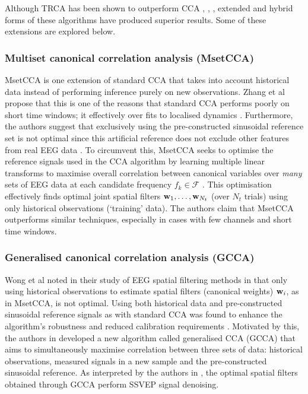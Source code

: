 Although TRCA has been shown to outperform CCA \cite{lee-trca-2step}, \cite{miao-hybrid-cca}, \cite{sun-gcca}, extended and hybrid forms of these algorithms have produced superior results. Some of these extensions are explored below.

\subsubsection{Multiset canonical correlation analysis (MsetCCA)}
MsetCCA is one extension of standard CCA that takes into account historical data instead of performing inference purely on new observations. Zhang et al propose that this is one of the reasons that standard CCA performs poorly on short time windows; it effectively over fits to localised dynamics \cite{zhang-mset-cca}. Furthermore, the authors suggest that exclusively using the pre-constructed sinusoidal reference set is not optimal since this artificial reference does not exclude other features from real EEG data \cite{zhang-mset-cca}. To circumvent this, MsetCCA seeks to optimise the reference signals used in the CCA algorithm by learning multiple linear transforms to maximise overall correlation between canonical variables over \textit{many} sets of EEG data at each candidate frequency $f_k \in \mathcal{F}$ \cite{zhang-mset-cca}. This optimisation effectively finds optimal joint spatial filters ${\mathbf{w}}_1, \dots, {\mathbf{w}}_{N_t}$ (over $N_t$ trials) using only historical observations (`training' data). The authors claim that MsetCCA outperforms similar techniques, especially in cases with few channels and short time windows. 

\subsubsection{Generalised canonical correlation analysis (GCCA)}
Wong et al noted in their study of EEG spatial filtering methods in \cite{wong-spatial-filt} that only using historical observations to estimate spatial filters (canonical weights) ${\mathbf{w}}_i$, as in MsetCCA, is not optimal. Using both historical data and pre-constructed sinusoidal reference signals as with standard CCA was found to enhance the algorithm's robustness and reduced calibration requirements \cite{wong-spatial-filt}.  Motivated by this, the authors in \cite{sun-gcca} developed a new algorithm called generalised CCA (GCCA) that aims to simultaneously maximise correlation between three sets of data: historical observations, measured signals in a new sample and the pre-constructed sinusoidal reference. As interpreted by the authors in \cite{sun-gcca}, the optimal spatial filters obtained through GCCA perform SSVEP signal denoising.

